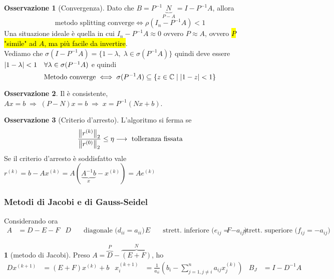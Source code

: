 \documentclass[a4paper,10pt]{article}
\theoremstyle{definition}
\theoremstyle{indentdefinition}
\theoremstyle{indenttheorem}
\theoremstyle{myremark}
\newtheorem*{rem*}{Osservazione}
\theoremstyle{indentgeneral}
\newtheorem{lyxalgorithm}[thm]{\protect\algorithmname}
\theoremstyle{plain}
\theoremstyle{plain}
\begin{document}
\begin{rem*}[Convergenza]
    Dato che $B=P^{-1}\underbrace{N}_{P-A}=I-P^{-1}A$, allora 
    $$\boxed{\text{metodo splitting converge}\iff \rho(I_n-P^{-1}A)<1}$$
    Una situazione ideale è quella in cui $I_n-P^{-1}A\approx 0$ ovvero $P\approx A$, ovvero \hl{$P$ "simile" ad $A$, ma più facile da invertire}. \\
    Vediamo che $\sigma(I-P^{-1}A)=\{1-\lambda,\;\lambda\in \sigma(P^{-1}A)\}$ quindi deve essere $\abs{1-\lambda}<1\quad \forall\lambda\in\sigma(P^{-1}A)$ e quindi
    $$\text{Metodo converge}\iff\sigma(P^{-1}A)\subseteq\{z\in\mathbb{C}\mid\abs{1-z}<1\}$$
\end{rem*}

\begin{rem*}
Il  è consistente, $Ax=b\;\Rightarrow\;\left(P-N\right)x=b\;\Rightarrow\;x=P^{-1}\left(Nx+b\right)$.
\end{rem*}

\begin{rem*}[Criterio d'arresto]
    L'algoritmo si ferma se
    $$\frac{\norm{r^{(k)}}_2}{\norm{r^{(0)}}_2}\le\eta \longrightarrow\text{ tolleranza fissata}$$
    Se il criterio d'arresto è soddisfatto vale $r^{(k)}=b-Ax^{(k)}=A(\underbrace{A^{-1}b}_{x}-x^{(k)})=Ae^{(k)}$
\end{rem*}

\subsubsection{Metodi di Jacobi e di Gauss-Seidel}

Considerando ora
\begin{align*}
A & =D-E-F & D & \quad\text{diagonale ($d_{ii}=a_{ii}$)} & E & \quad\text{strett. inferiore ($e_{ij}=-a_{ij}$)} & F & \quad\text{strett. superiore ($f_{ij}=-a_{ij}$)}
\end{align*}

\begin{lyxalgorithm}[metodo di Jacobi]
\label{def:metodo-di-jacobi}\textup{Preso $A=\overset{P}{\overbrace{D}}-\overset{N}{\overbrace{\left(E+F\right)}}$,
ho
\begin{align*}
Dx^{\left(k+1\right)} & =\left(E+F\right)x^{\left(k\right)}+b & x_{i}^{\left(k+1\right)} & =\frac{1}{a_{ii}}\left(b_{i}-\sum_{j=1,j\neq i}^{n}a_{ij}x_{j}^{\left(k\right)}\right) & B_{J} & =I-D^{-1}A
\end{align*}
}
\end{lyxalgorithm}
\end{document}
